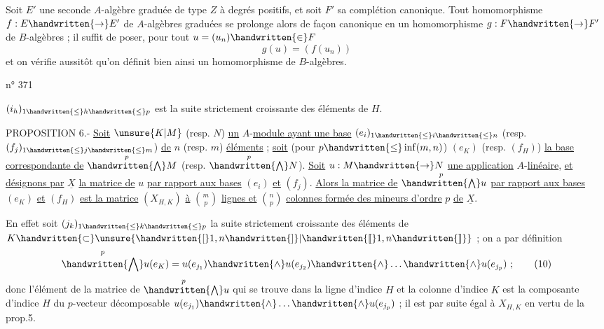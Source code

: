 Soit $E'$ une seconde $A$-algèbre graduée de type $Z$ à degrés positifs, et soit $F'$ sa complétion canonique. Tout homomorphisme $f:E\handwritten{\to}E'$ de $A$-algèbres graduées se prolonge alors de façon canonique en un homomorphisme $g:F\handwritten{\to}F'$ de $B$-algèbres ; il suffit de poser, pour tout $u=(u_n)\handwritten{\in}F$
\[
g(u)=(f(u_n))
\]
et on vérifie aussitôt qu'on définit bien ainsi un homomorphisme de $B$-algèbres.

\begin{flushright}n° 371\end{flushright}

$(i_h)_{1\handwritten{\leq}h\handwritten{\leq}p}$ est la suite strictement croissante des éléments de $H$.

PROPOSITION 6.- \uline{Soit} $\unsure{K|M}$ (resp. $N$) \uline{un} $A$-\uline{module ayant une base} $(e_i)_{1\handwritten{\leq}i\handwritten{\leq}n}$ (resp. $(f_j)_{1\handwritten{\leq}j\handwritten{\leq}m}$) \uline{de} $n$ (resp. $m$) \uline{éléments} ; \uline{soit} (pour $p\handwritten{\leq}\inf(m,n)$) $(e_K)$ (resp. $(f_H)$) \uline{la base correspondante de} $\overset{p}{\handwritten{\bigwedge}}M$ (resp. $\overset{p}{\handwritten{\bigwedge}}N$). \uline{Soit} $u:M\handwritten{\to}N$ \uline{une application} $A$-\uline{linéaire}, \uline{et désignons par} $\underline{X}$ \uline{la matrice de} $u$ \uline{par rapport aux bases} $(e_i)$ \uline{et} $(f_j)$. \uline{Alors la matrice de} $\overset{p}{\handwritten{\bigwedge}}u$ \uline{par rapport aux bases} $(e_K)$ \uline{et} $(f_H)$ \uline{est la matrice} $(X_{H,K})$ \uline{à} $\binom{m}{p}$ \uline{lignes et} $\binom{n}{p}$ \uline{colonnes formée des mineurs d'ordre} $p$ \uline{de} $\underline{X}$.

En effet soit $(j_k)_{1\handwritten{\leq}k\handwritten{\leq}p}$ la suite strictement croissante des éléments de $K\handwritten{\subset}\unsure{\handwritten{[}1,n\handwritten{]}|\handwritten{[\![}1,n\handwritten{]\!]}}$ ; on a par définition
\[
\overset{p}{\handwritten{\bigwedge}}u(e_K)=u(e_{j_1})\handwritten{\wedge}u(e_{j_2})\handwritten{\wedge}\ldots\handwritten{\wedge}u(e_{j_p})\ ;
\tag*{(10)}
\]
donc l'élément de la matrice de $\overset{p}{\handwritten{\bigwedge}}u$ qui se trouve dans la ligne d'indice $H$ et la colonne d'indice $K$ est la composante d'indice $H$ du $p$-vecteur décomposable $u(e_{j_1})\handwritten{\wedge}\ldots\handwritten{\wedge}u(e_{j_p})$ ; il est par suite égal à $X_{H,K}$ en vertu de la prop.5.

